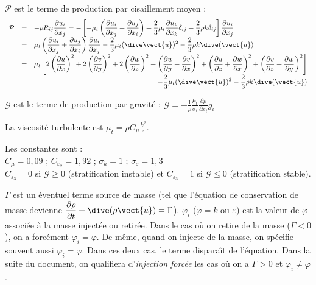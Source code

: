 $\mathcal{P}$ est le terme de production par cisaillement moyen :
\begin{displaymath}
\begin{array}{rcl}
\mathcal{P} & = & \displaystyle -\rho R_{ij}\frac{\partial u_i}{\partial x_j}
= -\left[-\mu_t \left(\frac{\partial u_i}{\partial x_j} +
\frac{\partial u_j}{\partial x_i}\right)
+\frac{2}{3}\mu_t\frac{\partial u_k}{\partial x_k}\delta_{ij}
+\frac{2}{3}\rho k\delta_{ij}\right]
\frac{\partial u_i}{\partial x_j}\\
& = & \displaystyle \mu_t \left(\frac{\partial u_i}{\partial x_j} +
\frac{\partial u_j}{\partial x_i}\right)\frac{\partial u_i}{\partial x_j}
-\frac{2}{3}\mu_t(\dive\vect{u})^2-\frac{2}{3}\rho k \dive(\vect{u})\\
& = & \displaystyle \mu_t \left[
2\left(\frac{\partial u}{\partial x}\right)^2+
2\left(\frac{\partial v}{\partial y}\right)^2+
2\left(\frac{\partial w}{\partial z}\right)^2+
\left(\frac{\partial u}{\partial y}+\frac{\partial v}{\partial x}\right)^2+
\left(\frac{\partial u}{\partial z}+\frac{\partial w}{\partial x}\right)^2+
\left(\frac{\partial v}{\partial z}+\frac{\partial w}{\partial y}\right)^2
\right]\\
\multicolumn{3}{r}%
{\displaystyle -\frac{2}{3}\mu_t(\dive\vect{u})^2-\frac{2}{3}\rho k \dive(\vect{u})}
\end{array}
\end{displaymath}

$\mathcal{G}$ est le terme de production par gravit\'e :
$\displaystyle
\mathcal{G}=-\frac{1}{\rho}\frac{\mu_t}{\sigma_t}
\frac{\partial\rho}{\partial x_i}g_i$

La viscosit\'e turbulente est
$\displaystyle \mu_t=\rho C_\mu\frac{k^2}{\varepsilon}$.

Les constantes sont :\\
$C_\mu=0,09$ ;
$C_{\varepsilon_2}=1,92$ ; $\sigma_k=1$ ; $\sigma_\varepsilon=1,3$\\
$C_{\varepsilon_3}=0$ si $\mathcal{G}\geqslant0$ (stratification instable) et
$C_{\varepsilon_3}=1$ si $\mathcal{G}\leqslant0$ (stratification stable).

$\Gamma$ est un \'eventuel terme source de masse (tel que l'\'equation de
conservation de masse devienne
$\displaystyle \frac{\partial \rho}{\partial t}+\dive(\rho\vect{u})=\Gamma$).
$\varphi_i$ ($\varphi=k$ ou $\varepsilon$) est la valeur de $\varphi$
associ\'ee \`a la masse inject\'ee ou retir\'ee. Dans le cas o\`u on retire de
la masse ($\Gamma<0$), on a forc\'ement $\varphi_i=\varphi$. De m\^eme, quand on
injecte de la masse, on sp\'ecifie souvent aussi $\varphi_i=\varphi$. Dans ces
deux cas, le terme dispara\^\i t de l'\'equation. Dans la suite du document, on
qualifiera d'{\em injection forc\'ee} les cas o\`u on a $\Gamma>0$ et
$\varphi_i\ne\varphi$.

